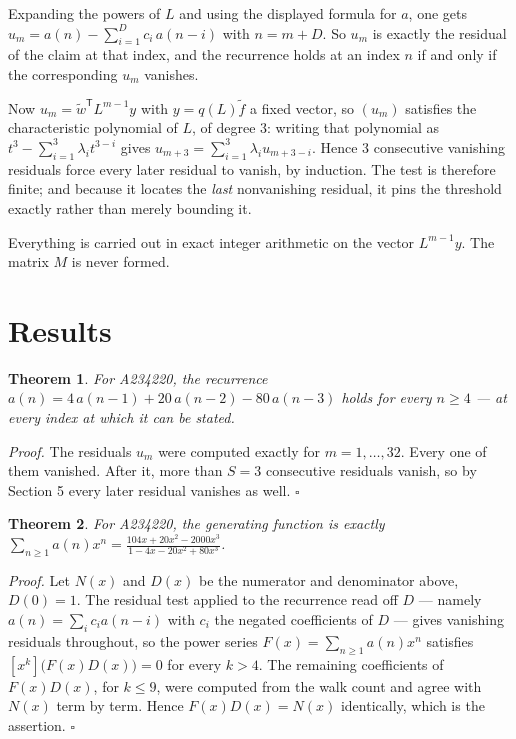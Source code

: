 \documentclass[11pt]{article}
\newtheorem{theorem}{Theorem}
\theoremstyle{definition}
\begin{document}
Expanding the powers of $L$ and using the displayed formula for $a$, one gets $u_m = a(n) - \sum_{i=1}^{D} c_i\,a(n-i)$ with $n = m + D$. So $u_m$ is exactly the residual of the claim at that index, and the recurrence holds at an index $n$ if and only if the corresponding $u_m$ vanishes.

Now $u_m = \tilde w^{\mathsf T} L^{m-1} y$ with $y = q(L)\tilde f$ a fixed vector, so $(u_m)$ satisfies the characteristic polynomial of $L$, of degree $3$: writing that polynomial as $t^{3} - \sum_{i=1}^{3} \lambda_i t^{3-i}$ gives $u_{m+3} = \sum_{i=1}^{3} \lambda_i u_{m+3-i}$. Hence $3$ consecutive vanishing residuals force every later residual to vanish, by induction. The test is therefore finite; and because it locates the {\itshape last} nonvanishing residual, it pins the threshold exactly rather than merely bounding it.

Everything is carried out in exact integer arithmetic on the vector $L^{m-1}y$. The matrix $M$ is never formed.

\section{Results}

\begin{theorem} For A234220, the recurrence $a(n) = 4\,a(n-1) + 20\,a(n-2) - 80\,a(n-3)$ holds for every $n \ge 4$ --- at every index at which it can be stated.\end{theorem}

{\itshape Proof.} The residuals $u_m$ were computed exactly for $m = 1,\dots,32$. Every one of them vanished. After it, more than $S = 3$ consecutive residuals vanish, so by Section 5 every later residual vanishes as well. $\square$

\begin{theorem} For A234220, the generating function is exactly $\sum_{n\ge 1} a(n)x^n = \frac{104x + 20x^{2} - 2000x^{3}}{1 - 4x - 20x^{2} + 80x^{3}}$.\end{theorem}

{\itshape Proof.} Let $N(x)$ and $D(x)$ be the numerator and denominator above, $D(0)=1$. The residual test applied to the recurrence read off $D$ --- namely $a(n) = \sum_i c_i a(n-i)$ with $c_i$ the negated coefficients of $D$ --- gives vanishing residuals throughout, so the power series $F(x)=\sum_{n\ge 1}a(n)x^n$ satisfies $[x^k]\bigl(F(x)D(x)\bigr) = 0$ for every $k > 4$. The remaining coefficients of $F(x)D(x)$, for $k \le 9$, were computed from the walk count and agree with $N(x)$ term by term. Hence $F(x)D(x) = N(x)$ identically, which is the assertion. $\square$
\end{document}
